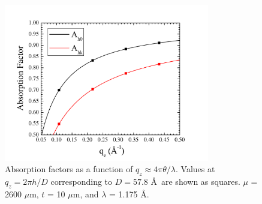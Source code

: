 \begin{figure}[htbp]
  \centering
  \includegraphics[width=0.8\textwidth]{figures/ripple/analysis/abs_factor}
  \caption{Absorption factors as a function of $q_z \approx 4\pi\theta/\lambda$.
  Values at $q_z=2\pi h/D$ corresponding to $D=57.8$ \AA\ are shown as squares.
  $\mu$ = 2600 $\mu$m, $t$ = 10 $\mu$m, and $\lambda$ = 1.175 \AA.}
  \label{fig:abs_factor}
\end{figure}

